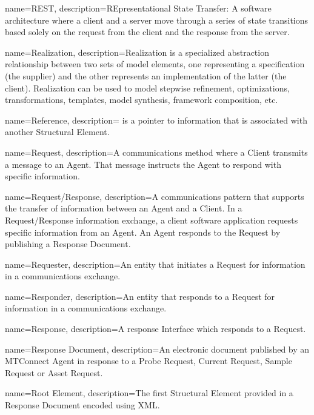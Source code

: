 {
    name={REST},
	description={REpresentational State Transfer:  A software architecture where a client and a server move through a series of state transitions based solely on the request from the client and the response from the server. 
}
}

{
    name={Realization},
	description={Realization is a specialized abstraction relationship between two sets of model elements, one representing a specification (the supplier) and the other represents an implementation of the latter (the client). Realization can be used to model stepwise refinement, optimizations, transformations, templates, model synthesis, framework composition, etc.}
}

{
    name={Reference},
	description={ is a pointer to information that is associated with another \gls{Structural Element}.}
}

{
    name={Request},
	description={A communications method where a \gls{Client} transmits a message to an \gls{Agent}.  That message instructs the \gls{Agent} to respond with specific information.}
}

{
    name={Request/Response},
	description={A communications pattern that supports the transfer of information between an \gls{Agent} and a \gls{Client}. 
In a \gls{Request/Response} information exchange, a client software application requests specific information from an \gls{Agent}. An \gls{Agent} responds to the \gls{Request} by publishing a \gls{Response Document}. }
}

{
    name={Requester},
	description={An entity that initiates a \gls{Request} for information in a communications exchange.}
}

{
    name={Responder},
	description={An entity that responds to a \gls{Request} for information in a communications exchange.}
}

{
    name={Response},
	description={A response \gls{Interface} which responds to a \gls{Request}.}
}

{
    name={Response Document},
	description={An electronic document published by an \gls{MTConnect Agent} in response to a \gls{Probe Request}, \gls{Current Request}, \gls{Sample Request} or \gls{Asset Request}.}
}

{
    name={Root Element},
	description={The first \gls{Structural Element} provided in a \gls{Response Document} encoded using XML. }
}

